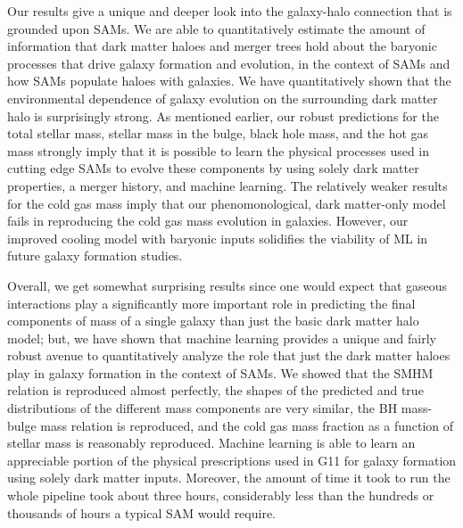 \documentclass[a4paper,fleqn,usenatbib]{mnras}
\begin{document}
\par 
Our results give a unique and deeper look into the galaxy-halo connection that is grounded upon SAMs. We are able to quantitatively estimate the amount of information that dark matter haloes and merger trees hold about the baryonic processes that drive galaxy formation and evolution, in the context of SAMs and how SAMs populate haloes with galaxies. We have quantitatively shown that the environmental dependence of galaxy evolution on the surrounding dark matter halo is surprisingly strong. As mentioned earlier, our robust predictions for the total stellar mass, stellar mass in the bulge, black hole mass, and the hot gas mass strongly imply that it is possible to learn the physical processes used in cutting edge SAMs to evolve these components by using solely dark matter properties, a merger history, and machine learning. The relatively weaker results for the cold gas mass imply that our phenomonological, dark matter-only model fails in reproducing the cold gas mass evolution in galaxies. However, our improved cooling model with baryonic inputs solidifies the viability of ML in future galaxy formation studies. 

\par
Overall, we get somewhat surprising results since one would expect that gaseous interactions play a significantly more important role in predicting the final components of mass of a single galaxy than just the basic dark matter halo model; but, we have shown that machine learning provides a unique and fairly robust avenue to quantitatively analyze the role that just the dark matter haloes play in galaxy formation in the context of SAMs. We showed that the SMHM relation is reproduced almost perfectly, the shapes of the predicted and true distributions of the different mass components are very similar, the BH mass-bulge mass relation is reproduced, and the cold gas mass fraction as a function of stellar mass is reasonably reproduced. Machine learning is able to learn an appreciable portion of the physical prescriptions used in G11 for galaxy formation using solely dark matter inputs. Moreover, the amount of time it took to run the whole pipeline took about three hours, considerably less than the hundreds or thousands of hours a typical SAM would require.
\end{document}
